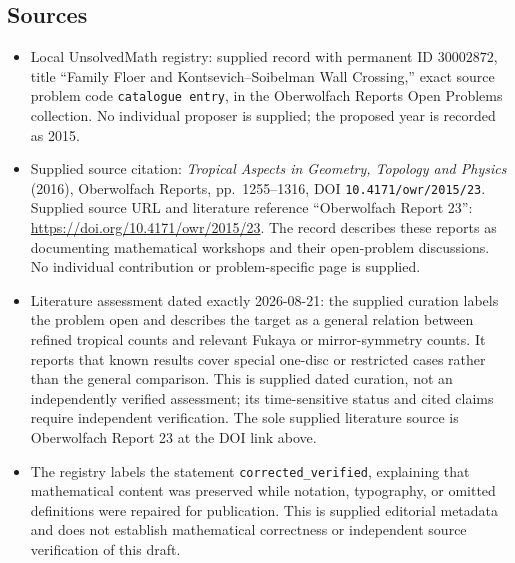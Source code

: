 \documentclass[11pt]{article}
\begin{document}
\subsection{Sources}
\begin{itemize}
\item Local UnsolvedMath registry: supplied record with permanent ID \(30002872\), title ``Family Floer and Kontsevich--Soibelman Wall Crossing,'' exact source problem code \texttt{catalogue entry}, in the Oberwolfach Reports Open Problems collection. No individual proposer is supplied; the proposed year is recorded as 2015.
\item Supplied source citation: \textit{Tropical Aspects in Geometry, Topology and Physics} (2016), Oberwolfach Reports, pp.~1255--1316, DOI \texttt{10.4171/owr/2015/23}. Supplied source URL and literature reference ``Oberwolfach Report 23'': \url{https://doi.org/10.4171/owr/2015/23}. The record describes these reports as documenting mathematical workshops and their open-problem discussions. No individual contribution or problem-specific page is supplied.
\item Literature assessment dated exactly 2026-08-21: the supplied curation labels the problem open and describes the target as a general relation between refined tropical counts and relevant Fukaya or mirror-symmetry counts. It reports that known results cover special one-disc or restricted cases rather than the general comparison. This is supplied dated curation, not an independently verified assessment; its time-sensitive status and cited claims require independent verification. The sole supplied literature source is Oberwolfach Report 23 at the DOI link above.
\item The registry labels the statement \texttt{corrected\_verified}, explaining that mathematical content was preserved while notation, typography, or omitted definitions were repaired for publication. This is supplied editorial metadata and does not establish mathematical correctness or independent source verification of this draft.
\end{itemize}
\end{document}
